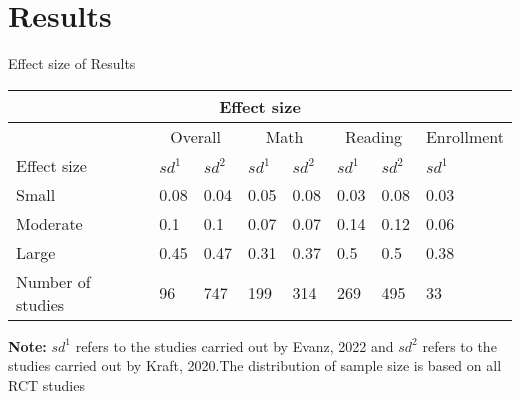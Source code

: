\documentclass[9pt]{beamer}
\begin{document}

 
\section{Results}

\begin{frame}{Effect size of Results  } \label{size}

\begin{table}[]
 
\begin{tabular}{llllllll}
\hline
\multicolumn{8}{c}{Effect size}                                                                                         \\ \hline
                  & \multicolumn{2}{c}{Overall} & \multicolumn{2}{c}{Math}  & \multicolumn{2}{c}{Reading} & Enrollment  \\ \hline
Effect size       & $sd^1$  & $sd^2$  & $sd^1$ & $sd^2$  & $sd^1$  & $sd^2$ & $sd^1$  \\
Small             & 0.08         & 0.04         & 0.05        & 0.08        & 0.03         & 0.08         & 0.03        \\
Moderate          & 0.1          & 0.1          & 0.07        & 0.07        & 0.14         & 0.12         & 0.06        \\
Large             & 0.45         & 0.47         & 0.31        & 0.37        & 0.5          & 0.5          & 0.38        \\
Number of studies & 96           & 747          & 199         & 314         & 269          & 495          & 33          \\ \hline
\end{tabular}
 
 \begin{tablenotes}
      \small
      \textbf{Note: } $sd^1$ refers to the studies carried out by Evanz, 2022 and 
      $sd^2$ refers to the studies carried out by Kraft, 2020.The distribution of sample size is based on all RCT studies  
       
    \end{tablenotes}
\end{table}
    
\end{frame}
\end{document}
